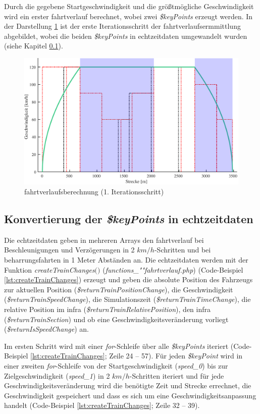Durch die gegebene Startgeschwindigkeit und die größtmögliche Geschwindigkeit wird ein erster \Gls{fahrtverlauf} berechnet, wobei zwei \textit{\$keyPoints} erzeugt werden. In der Darstellung \ref{fig:it3} ist der erste Iterationsschritt der \Gls{fahrtverlauf}sermmittlung abgebildet, wobei die beiden \textit{\$keyPoints} in \Gls{echtzeitdaten} umgewandelt wurden (siehe Kapitel \ref{keypointumwandlung}).
\begin{figure}
\includegraphics[width=\linewidth]{../images/matlab/it3.pdf}
\caption{\Gls{fahrtverlauf}sberechnung (1. Iterationsschritt)}
\label{fig:it3}
\end{figure}
\subsection{Konvertierung der \textit{\$keyPoints} in \Gls{echtzeitdaten}} \label{keypointumwandlung}
Die \Gls{echtzeitdaten} geben in mehreren Arrays den \Gls{fahrtverlauf} bei Beschleunigungen und Verzögerungen in 2 $km/h$-Schritten und bei \Gls{beharrungsfahrt}en in 1 Meter Abständen an. Die \Gls{echtzeitdaten} werden mit der Funktion \textit{createTrainChanges$($$)$} (\textit{func\-tions\_""fahrt\-ver\-lauf.php}) (Code-Beispiel \ref{lst:createTrainChanges}) erzeugt und geben die absolute Position des Fahrzeugs zur aktuellen Position (\textit{\$returnTrainPositionChange}), die Geschwindigkeit (\textit{\$returnTrainSpeedChange}), die Simulationszeit (\textit{\$returnTrainTimeChange}), die relative Position im \ac{infra} (\textit{\$returnTrainRelativePosition}), den \ac{infra} (\textit{\$returnTrainSection}) und ob eine Geschwindigkeitsveränderung vorliegt (\textit{\$return\-Is\-SpeedChange}) an.

Im ersten Schritt wird mit einer \textit{for}-Schleife über alle \textit{\$keyPoints} iteriert (Code-Beispiel \ref{lst:createTrainChanges}; Zeile 24 -- 57). Für jeden \textit{\$keyPoint} wird in einer zweiten \textit{for}-Schleife von der Startgeschwindigkeit (\textit{speed\_0}) bis zur Zielgeschwindigkeit (\textit{speed\_1}) in 2 $km/h$-Schritten iteriert und für jede Geschwindigkeitsveränderung wird die benötigte Zeit und Strecke errechnet, die Geschwindigkeit gespeichert und dass es sich um eine Geschwindigkeitsanpassung handelt (Code-Beispiel \ref{lst:createTrainChanges}; Zeile 32 -- 39). 

